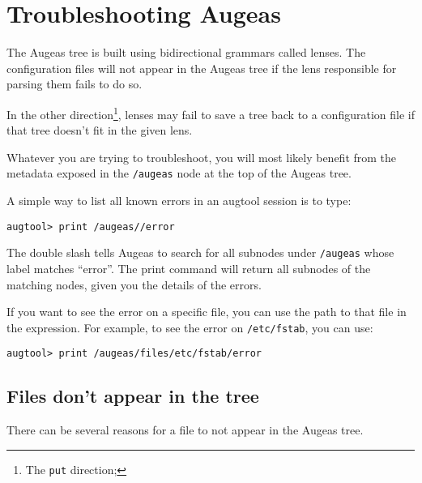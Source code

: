 \chapter{Troubleshooting Augeas}

\label{chap:troubleshooting} 

The Augeas tree is built using bidirectional grammars called lenses. The configuration files will not appear in the Augeas tree if the lens responsible for parsing them fails to do so.

In the other direction\footnote{The \verb!put! direction; }, lenses may fail to save a tree back to a configuration file if that tree doesn't fit in the given lens.

Whatever you are trying to troubleshoot, you will most likely benefit from the metadata exposed in the \nolinkurl{/augeas} node at the top of the Augeas tree.

A simple way to list all known errors in an augtool session is to type:

 

\begin{verbatim}
augtool> print /augeas//error
\end{verbatim}

The double slash tells Augeas to search for all subnodes under \nolinkurl{/augeas} whose label matches ``error''. The print command will return all subnodes of the matching nodes, given you the details of the errors.

If you want to see the error on a specific file, you can use the path to that file in the expression. For example, to see the error on \nolinkurl{/etc/fstab}, you can use:

 

\begin{verbatim}
augtool> print /augeas/files/etc/fstab/error
\end{verbatim}

\section{Files don't appear in the tree}

There can be several reasons for a file to not appear in the Augeas tree.

